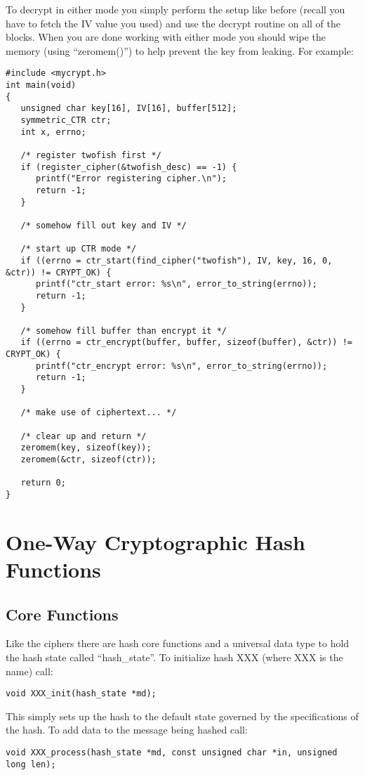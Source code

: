\documentclass{book}
\begin{document}
To decrypt in either mode you simply perform the setup like before (recall you have to fetch the IV value you used)
and use the decrypt routine on all of the blocks.  When you are done working with either mode you should wipe the 
memory (using ``zeromem()'') to help prevent the key from leaking.  For example:
\newpage
\begin{small}
\begin{verbatim}
#include <mycrypt.h>
int main(void)
{
   unsigned char key[16], IV[16], buffer[512];
   symmetric_CTR ctr;
   int x, errno;

   /* register twofish first */
   if (register_cipher(&twofish_desc) == -1) {
      printf("Error registering cipher.\n");
      return -1;
   }

   /* somehow fill out key and IV */

   /* start up CTR mode */
   if ((errno = ctr_start(find_cipher("twofish"), IV, key, 16, 0, &ctr)) != CRYPT_OK) {
      printf("ctr_start error: %s\n", error_to_string(errno));
      return -1;
   }

   /* somehow fill buffer than encrypt it */
   if ((errno = ctr_encrypt(buffer, buffer, sizeof(buffer), &ctr)) != CRYPT_OK) {
      printf("ctr_encrypt error: %s\n", error_to_string(errno));
      return -1;
   }

   /* make use of ciphertext... */

   /* clear up and return */
   zeromem(key, sizeof(key));
   zeromem(&ctr, sizeof(ctr));

   return 0;
}
\end{verbatim}
\end{small}

\chapter{One-Way Cryptographic Hash Functions}
\section{Core Functions}

Like the ciphers there are hash core functions and a universal data type to hold the hash state called ``hash\_state''.  
To initialize hash XXX (where XXX is the name) call:
\begin{verbatim}
void XXX_init(hash_state *md);
\end{verbatim}

This simply sets up the hash to the default state governed by the specifications of the hash.  To add data to the 
message being hashed call:
\begin{verbatim}
void XXX_process(hash_state *md, const unsigned char *in, unsigned long len);
\end{verbatim}
\end{document}
